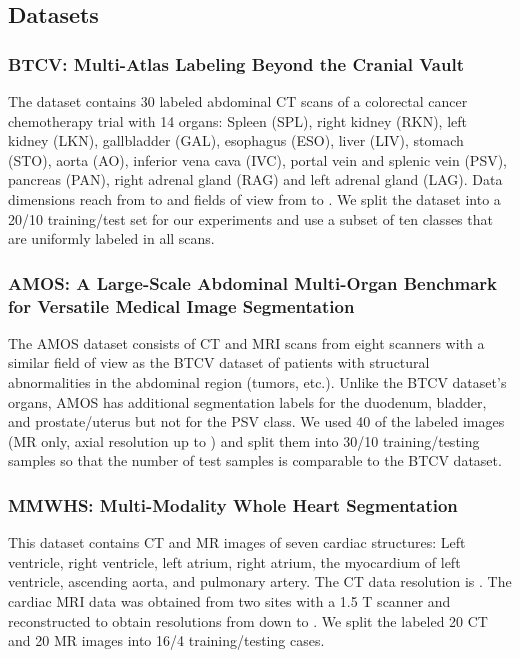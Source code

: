     \subsection{Datasets}
        \subsubsection{BTCV: Multi-Atlas Labeling Beyond the Cranial Vault}
        \label{sec:BTCV_dataset}
        The dataset \citep{landman2015miccai} contains 30 labeled abdominal CT scans of a colorectal cancer chemotherapy trial with 14  organs: Spleen (SPL), right kidney (RKN), left kidney (LKN), gallbladder (GAL), esophagus (ESO), liver (LIV), stomach (STO), aorta (AO), inferior vena cava (IVC), portal vein and splenic vein (PSV), pancreas (PAN), right adrenal gland (RAG) and left adrenal gland (LAG).
        Data dimensions reach from  to  and fields of view from  to . We split the dataset into a 20/10 training/test set for our experiments and use a subset of ten classes that are uniformly labeled in all scans.

        \subsubsection{AMOS: A Large-Scale Abdominal Multi-Organ Benchmark
        for Versatile Medical Image Segmentation}
            \label{sec:amos_dataset}
            The AMOS dataset \citep{ji2022amos} consists of CT and MRI scans from eight scanners with a similar field of view as the BTCV dataset of patients with structural abnormalities in the abdominal region (tumors, etc.). Unlike the BTCV dataset's organs, AMOS has additional segmentation labels for the duodenum, bladder, and prostate/uterus but not for the PSV class. We used 40 of the labeled images (MR only, axial resolution  up to ) and split them into 30/10 training/testing samples so that the number of test samples is comparable to the BTCV dataset.


        \subsubsection{MMWHS: Multi-Modality Whole Heart Segmentation}
            \label{sec:MMWHS_dataset}
            This dataset \citep{zhuang2019evaluation} contains CT and MR images of seven cardiac structures: Left ventricle, right ventricle, left atrium, right atrium, the myocardium of left ventricle, ascending aorta, and pulmonary artery.
            The CT data resolution is .
            The cardiac MRI data was obtained from two sites with a 1.5 T scanner and reconstructed to obtain resolutions from  down to .
            We split the labeled 20 CT and 20 MR images into 16/4 training/testing cases.

